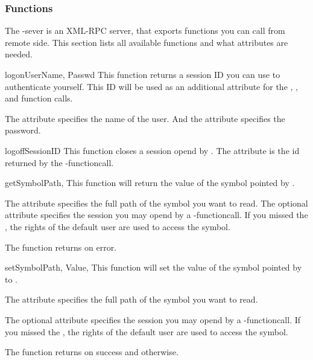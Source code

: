 \subsubsection{Functions}
The -sever is an XML-RPC server, that exports 
functions you can call from remote side. This section lists all available 
functions and what attributes are needed. 

\begin{funcdescni}{logon}{UserName, Passwd}
This function returns a session ID you can use to authenticate yourself. This 
ID will be used as an additional attribute for the , 
 ,  and 
 function calls.

The attribute  specifies the name of the user. And
the attribute  specifies the password.
\end{funcdescni}


\begin{funcdescni}{logoff}{SessionID}
This function closes a session opend by .
The attribute  is the id returned by the
-functioncall.
\end{funcdescni}


\begin{funcdescni}{get}{SymbolPath,}
This function will return the value of the symbol pointed by .

The attribute  specifies the full path of the symbol you want 
to read.
The optional attribute  specifies the session you may opend by 
a -functioncall. If you missed the , the 
rights of the default user are used to access the symbol. 

The function returns  on error.
\end{funcdescni}


\begin{funcdescni}{set}{SymbolPath, Value, }
This function will set the value of the symbol pointed by  to 
.

The attribute  specifies the full path of the symbol you want 
to read.

The optional attribute  specifies the session you may opend by 
a -functioncall. If you missed the , the 
rights of the default user are used to access the symbol. 

The function returns  on success and  otherwise.
\end{funcdescni}


